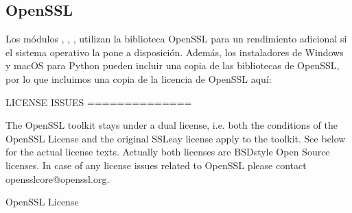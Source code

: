 \documentclass[a4,10pt,spanish]{sphinxmanual}
\begin{document}
\subsection{OpenSSL}
\label{\detokenize{license:openssl}}
\sphinxAtStartPar
Los módulos , , ,  utilizan la biblioteca OpenSSL para un rendimiento adicional si el sistema operativo la pone a disposición. Además, los instaladores de Windows y macOS para Python pueden incluir una copia de las bibliotecas de OpenSSL, por lo que incluimos una copia de la licencia de OpenSSL aquí:

\begin{sphinxVerbatim}[commandchars=\\\{\}]
 LICENSE ISSUES
 ==============

 The OpenSSL toolkit stays under a dual license, i.e. both the conditions of
 the OpenSSL License and the original SSLeay license apply to the toolkit.
 See below for the actual license texts. Actually both licenses are BSD\PYGZhy{}style
 Open Source licenses. In case of any license issues related to OpenSSL
 please contact openssl\PYGZhy{}core@openssl.org.

 OpenSSL License
 \PYGZhy{}\PYGZhy{}\PYGZhy{}\PYGZhy{}\PYGZhy{}\PYGZhy{}\PYGZhy{}\PYGZhy{}\PYGZhy{}\PYGZhy{}\PYGZhy{}\PYGZhy{}\PYGZhy{}\PYGZhy{}\PYGZhy{}


\end{sphinxVerbatim}
\end{document}
